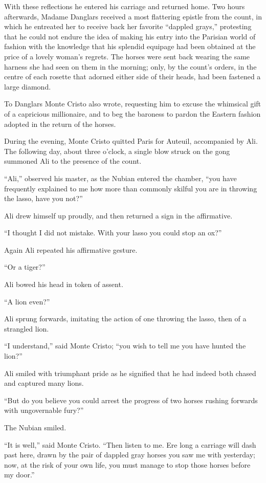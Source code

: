 With these reflections he entered his carriage and returned home. Two
hours afterwards, Madame Danglars received a most flattering epistle
from the count, in which he entreated her to receive back her favorite
“dappled grays,” protesting that he could not endure the idea of making
his entry into the Parisian world of fashion with the knowledge that
his splendid equipage had been obtained at the price of a lovely
woman’s regrets. The horses were sent back wearing the same harness she
had seen on them in the morning; only, by the count’s orders, in the
centre of each rosette that adorned either side of their heads, had
been fastened a large diamond.

To Danglars Monte Cristo also wrote, requesting him to excuse the
whimsical gift of a capricious millionaire, and to beg the baroness to
pardon the Eastern fashion adopted in the return of the horses.

During the evening, Monte Cristo quitted Paris for Auteuil, accompanied
by Ali. The following day, about three o’clock, a single blow struck on
the gong summoned Ali to the presence of the count.

“Ali,” observed his master, as the Nubian entered the chamber, “you
have frequently explained to me how more than commonly skilful you are
in throwing the lasso, have you not?”

Ali drew himself up proudly, and then returned a sign in the
affirmative.

“I thought I did not mistake. With your lasso you could stop an ox?”

Again Ali repeated his affirmative gesture.

“Or a tiger?”

Ali bowed his head in token of assent.

“A lion even?”

Ali sprung forwards, imitating the action of one throwing the lasso,
then of a strangled lion.

“I understand,” said Monte Cristo; “you wish to tell me you have hunted
the lion?”

Ali smiled with triumphant pride as he signified that he had indeed
both chased and captured many lions.

“But do you believe you could arrest the progress of two horses rushing
forwards with ungovernable fury?”

The Nubian smiled.

“It is well,” said Monte Cristo. “Then listen to me. Ere long a
carriage will dash past here, drawn by the pair of dappled gray horses
you saw me with yesterday; now, at the risk of your own life, you must
manage to stop those horses before my door.”

